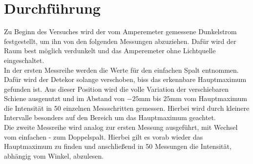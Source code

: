 \section{Durchführung}
Zu Beginn des Versuches wird der vom Amperemeter gemessene Dunkelstrom festgestellt, um ihn von den folgenden Messungen abzuziehen.
Dafür wird der Raum best möglich verdunkelt und das Amperemeter ohne Lichtquelle eingeschaltet.
\\ 
\newline
In der ersten Messreihe werden die Werte für den einfachen Spalt entnommen. Dafür wird der Detekor solange verschoben, biss das erkennbare Hauptmaximum 
gefunden ist. Aus dieser Position wird die volle Variation der verschiebaren Schiene ausgenutzt und im Abstand von $-25 \si{\mm}$ bis 
$25 \si{\mm}$ vom Hauptmaximum die Intensität in 50 einzelnen Messschritten gemessen. 
Hierbei wird durch kleinere Intervalle besonders auf den Bereich um das Hauptmaximum geachtet.
\\
\newline
Die zweite Messreihe wird analog zur ersten Messung ausgeführt, mit Wechsel vom einfachen - zum Doppelspalt.
Hierbei gilt es vorab wieder das Hauptmaximum zu finden und anschließend in 50 Messungen die Intensität, abhängig vom Winkel,
abzulesen. 